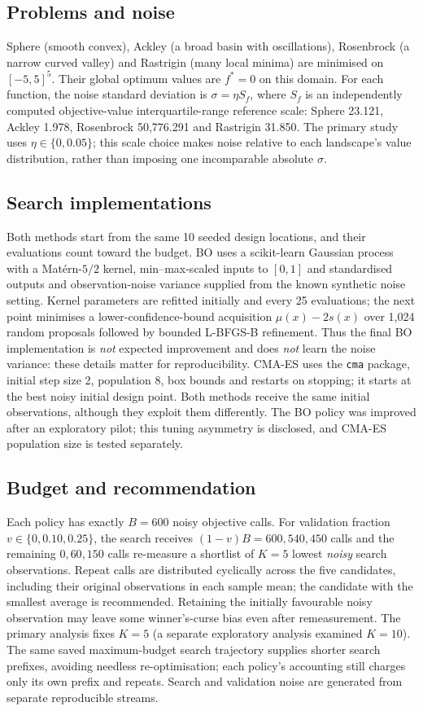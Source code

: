 \documentclass[11pt,a4paper]{article}
\begin{document}
\subsection{Problems and noise}
Sphere (smooth convex), Ackley (a broad basin with oscillations), Rosenbrock (a narrow curved valley) and Rastrigin (many local minima) are minimised on $[-5,5]^5$. Their global optimum values are $f^*=0$ on this domain. For each function, the noise standard deviation is $\sigma=\eta S_f$, where $S_f$ is an independently computed objective-value interquartile-range reference scale: Sphere 23.121, Ackley 1.978, Rosenbrock 50,776.291 and Rastrigin 31.850. The primary study uses $\eta\in\{0,0.05\}$; this scale choice makes noise relative to each landscape's value distribution, rather than imposing one incomparable absolute $\sigma$.

\subsection{Search implementations}
Both methods start from the same 10 seeded design locations, and their evaluations count toward the budget. BO uses a scikit-learn Gaussian process with a Mat\'ern-$5/2$ kernel, min--max-scaled inputs to $[0,1]$ and standardised outputs and observation-noise variance supplied from the known synthetic noise setting. Kernel parameters are refitted initially and every 25 evaluations; the next point minimises a lower-confidence-bound acquisition $\mu(x)-2s(x)$ over 1,024 random proposals followed by bounded L-BFGS-B refinement. Thus the final BO implementation is \emph{not} expected improvement and does \emph{not} learn the noise variance: these details matter for reproducibility. CMA-ES uses the \texttt{cma} package, initial step size 2, population 8, box bounds and restarts on stopping; it starts at the best noisy initial design point. Both methods receive the same initial observations, although they exploit them differently. The BO policy was improved after an exploratory pilot; this tuning asymmetry is disclosed, and CMA-ES population size is tested separately.

\subsection{Budget and recommendation}
Each policy has exactly $B=600$ noisy objective calls. For validation fraction $v\in\{0,0.10,0.25\}$, the search receives $(1-v)B=600,540,450$ calls and the remaining $0,60,150$ calls re-measure a shortlist of $K=5$ lowest \emph{noisy} search observations. Repeat calls are distributed cyclically across the five candidates, including their original observations in each sample mean; the candidate with the smallest average is recommended. Retaining the initially favourable noisy observation may leave some winner's-curse bias even after remeasurement. The primary analysis fixes $K=5$ (a separate exploratory analysis examined $K=10$). The same saved maximum-budget search trajectory supplies shorter search prefixes, avoiding needless re-optimisation; each policy's accounting still charges only its own prefix and repeats. Search and validation noise are generated from separate reproducible streams.
\end{document}

